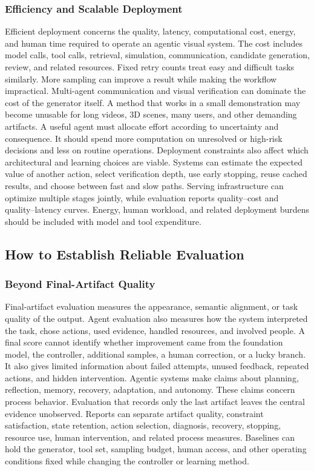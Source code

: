 \subsubsection{Efficiency and Scalable Deployment}

Efficient deployment concerns the quality, latency, computational cost, energy, and human time required to operate an agentic visual system. The cost includes model calls, tool calls, retrieval, simulation, communication, candidate generation, review, and related resources. Fixed retry counts treat easy and difficult tasks similarly. More sampling can improve a result while making the workflow impractical. Multi-agent communication and visual verification can dominate the cost of the generator itself. A method that works in a small demonstration may become unusable for long videos, 3D scenes, many users, and other demanding artifacts. A useful agent must allocate effort according to uncertainty and consequence. It should spend more computation on unresolved or high-risk decisions and less on routine operations. Deployment constraints also affect which architectural and learning choices are viable. Systems can estimate the expected value of another action, select verification depth, use early stopping, reuse cached results, and choose between fast and slow paths. Serving infrastructure can optimize multiple stages jointly, while evaluation reports quality--cost and quality--latency curves. Energy, human workload, and related deployment burdens should be included with model and tool expenditure.


\subsection{How to Establish Reliable Evaluation}

\subsubsection{Beyond Final-Artifact Quality}

Final-artifact evaluation measures the appearance, semantic alignment, or task quality of the output. Agent evaluation also measures how the system interpreted the task, chose actions, used evidence, handled resources, and involved people. A final score cannot identify whether improvement came from the foundation model, the controller, additional samples, a human correction, or a lucky branch. It also gives limited information about failed attempts, unused feedback, repeated actions, and hidden intervention. Agentic systems make claims about planning, reflection, memory, recovery, adaptation, and autonomy. These claims concern process behavior. Evaluation that records only the last artifact leaves the central evidence unobserved. Reports can separate artifact quality, constraint satisfaction, state retention, action selection, diagnosis, recovery, stopping, resource use, human intervention, and related process measures. Baselines can hold the generator, tool set, sampling budget, human access, and other operating conditions fixed while changing the controller or learning method.


